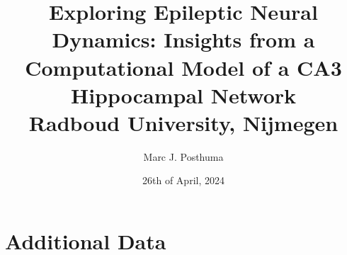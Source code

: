 \documentclass[12pt]{report}
\title{
    {Exploring Epileptic Neural Dynamics: Insights from a Computational Model of a CA3 Hippocampal Network}\\
    {\large Radboud University, Nijmegen}\\
}
\author{Marc J. Posthuma}
\date{26th of April, 2024}
\begin{document}
\maketitle

\tableofcontents
\listoffigures
\listoftables






\appendix
\chapter{Additional Data}


\printbibliography%
\end{document}

